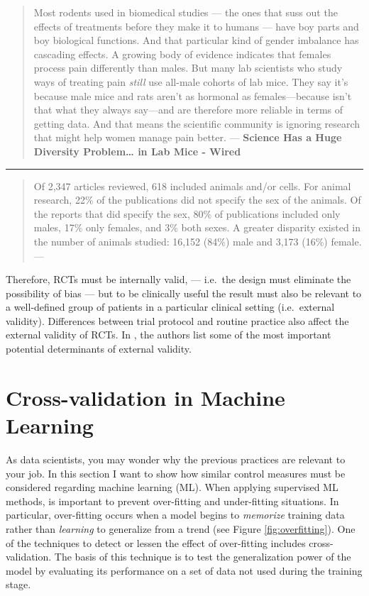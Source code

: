 \documentclass[
  12pt,
]{book}
\begin{document}
\begin{quote}
Most rodents used in biomedical studies --- the ones that suss out the effects of treatments before they make it to humans --- have boy parts and boy biological functions. And that particular kind of gender imbalance has cascading effects. A growing body of evidence indicates that females process pain differently than males. But many lab scientists who study ways of treating pain \emph{still }use all-male cohorts of lab mice. They say it's because male mice and rats aren't as hormonal as females---because isn't that what they always say---and are therefore more reliable in terms of getting data. And that means the scientific community is ignoring research that might help women manage pain better. --- \textbf{Science Has a Huge Diversity Problem\ldots{} in Lab Mice - Wired}
\end{quote}

\begin{center}\rule{0.5\linewidth}{0.5pt}\end{center}

\begin{quote}
Of 2,347 articles reviewed, 618 included animals and/or cells. For animal research, 22\% of the publications did not specify the sex of the animals. Of the reports that did specify the sex, 80\% of publications included only males, 17\% only females, and 3\% both sexes. A greater disparity existed in the number of animals studied: 16,152 (84\%) male and 3,173 (16\%) female. --- \citep{yoon2014sex}
\end{quote}

Therefore, RCTs must be internally valid, --- i.e.~the design must eliminate the possibility of bias --- but to be clinically useful the result must also be relevant to a well-defined group of patients in a particular clinical setting (i.e.~external validity). Differences between trial protocol and routine practice also affect the external validity of RCTs. In \citep{rothwell2006factors}, the authors list some of the most important potential determinants of external validity.

\section{Cross-validation in Machine Learning}\label{cross-validation-in-machine-learning}

As data scientists, you may wonder why the previous practices are relevant to your job. In this section I want to show how similar control measures must be considered regarding machine learning (ML). When applying supervised ML methods, is important to prevent over-fitting and under-fitting situations. In particular, over-fitting occurs when a model begins to \emph{memorize} training data rather than \emph{learning} to generalize from a trend (see Figure \ref{fig:overfitting}). One of the techniques to detect or lessen the effect of over-fitting includes cross-validation. The basis of this technique is to test the generalization power of the model by evaluating its performance on a set of data not used during the training stage.
\end{document}
